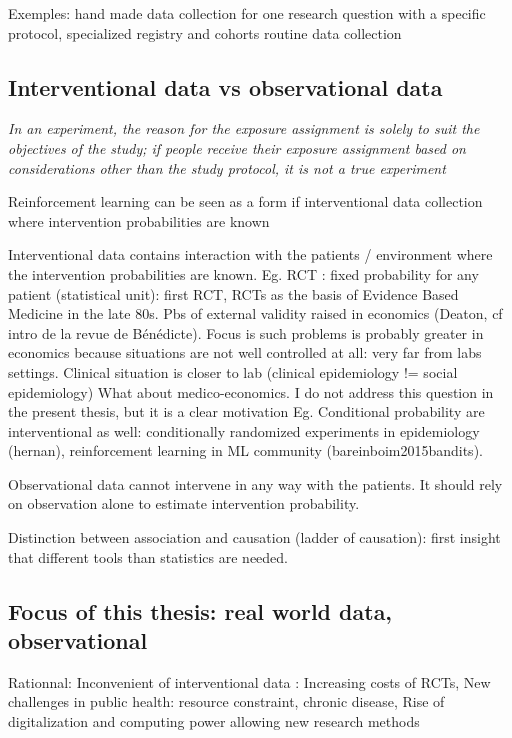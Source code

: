 \documentclass{report}
\begin{document}
Exemples:
hand made data collection for one research question with a specific protocol,
specialized registry and cohorts
routine data collection


\subsection{Interventional data vs observational
  data}\label{subsec:intro:interventional_vs_observational}


\textit{In an experiment, the reason for the exposure assignment is solely to
  suit the objectives of the study; if people receive their exposure assignment
  based on considerations other than the study protocol, it is not a true
  experiment} \citep{rothman2012epidemiology}

Reinforcement learning can be seen as a form if
interventional data collection where intervention probabilities are known
\cite{bareinboim2015bandits}


Interventional data contains interaction with the patients / environment where the intervention probabilities are known.
Eg. RCT : fixed probability for any patient (statistical unit): first RCT, RCTs as the basis of Evidence Based Medicine in the late 80s.
Pbs of external validity raised in economics (Deaton, cf intro de la revue de Bénédicte). Focus is such problems is probably greater in economics because situations are not well controlled at all: very far from labs settings. Clinical situation is closer to lab (clinical epidemiology != social epidemiology)
What about medico-economics. I do not address this question in the present thesis, but it is a clear motivation
Eg. Conditional probability are interventional as well: conditionally randomized experiments in epidemiology (hernan), reinforcement learning in ML community (bareinboim2015bandits).

Observational data cannot intervene in any way with the patients. It should rely on observation alone to estimate intervention probability.

Distinction between association and causation (ladder of causation): first insight that different tools than statistics are needed.

\subsection{Focus of this thesis: real world data, observational}\label{subsec:intro:focus_data}

Rationnal:
Inconvenient of interventional data : Increasing costs of RCTs,
New challenges in public health: resource constraint, chronic disease,
Rise of digitalization and computing power allowing new research methods
\end{document}
